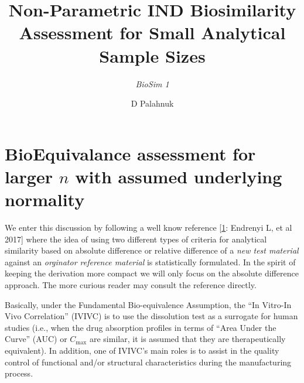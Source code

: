 \documentclass[
  12pt,
  a4paper,
]{article}
\title{Non-Parametric IND Biosimilarity Assessment for Small Analytical
Sample Sizes}
\subtitle{\textit{BioSim 1}}
\author{D Palahnuk}
\date{\vhCurrentDate\\
version \vhCurrentVersion\\
\strut \\
InsightHatch: ``Non-Parametric Biosimilarity Assessment for Small
Analytical Sample Sizes when dealing with IND Dossier Data''\\
\textbf{IH-NonParBioSim-v}\textbf{\vhCurrentVersion}}
\numberwithin{equation}{section}
\theoremstyle{plain}
\theoremstyle{definition}
\theoremstyle{remark}
\theoremstyle{note}
\begin{document}
\maketitle

{
\setcounter{tocdepth}{2}
\tableofcontents
}
\hfill\break

\begin{versionhistory}
\end{versionhistory}

\newpage

\setcounter{table}{0}

\hypertarget{bioequivalance-assessment-for-larger-n-with-assumed-underlying-normality}{%
\section{\texorpdfstring{BioEquivalance assessment for larger \(n\) with
assumed underlying
normality}{BioEquivalance assessment for larger n with assumed underlying normality}}\label{bioequivalance-assessment-for-larger-n-with-assumed-underlying-normality}}

We enter this discussion by following a well know reference
{[}\protect\hyperlink{ref-endrenyi_biosimilar_2017}{1}: Endrenyi L, et
al 2017{]} where the idea of using two different types of criteria for
analytical similarity based on absolute difference or relative
difference of a \emph{new test material} against an \emph{orginator
reference material} is statistically formulated. In the spirit of
keeping the derivation more compact we will only focus on the absolute
difference approach. The more curious reader may consult the reference
directly.

Basically, under the Fundamental Bio-equivalence Assumption, the ``In
Vitro-In Vivo Correlation'' (IVIVC) is to use the dissolution test as a
surrogate for human studies (i.e., when the drug absorption profiles in
terms of ``Area Under the Curve'' (AUC) or \(C_{\max }\) are similar, it
is assumed that they are therapeutically equivalent). In addition, one
of IVIVC's main roles is to assist in the quality control of functional
and/or structural characteristics during the manufacturing process.
\end{document}
